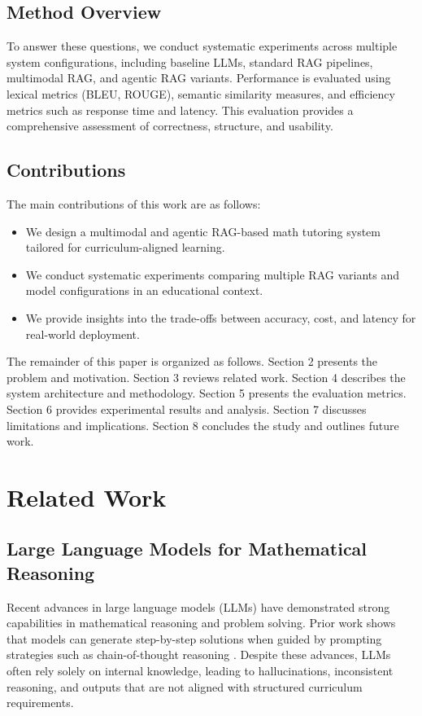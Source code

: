 \documentclass[11pt]{article}
\begin{document}
\subsection{Method Overview}

To answer these questions, we conduct systematic experiments across multiple system configurations, including baseline LLMs, standard RAG pipelines, multimodal RAG, and agentic RAG variants. Performance is evaluated using lexical metrics (BLEU, ROUGE), semantic similarity measures, and efficiency metrics such as response time and latency. This evaluation provides a comprehensive assessment of correctness, structure, and usability.

\subsection{Contributions}

The main contributions of this work are as follows:
\begin{itemize}
    \item We design a multimodal and agentic RAG-based math tutoring system tailored for curriculum-aligned learning.
    
    \item We conduct systematic experiments comparing multiple RAG variants and model configurations in an educational context.
    \item We provide insights into the trade-offs between accuracy, cost, and latency for real-world deployment.
\end{itemize}

The remainder of this paper is organized as follows. Section 2 presents the problem and motivation. Section 3 reviews related work. Section 4 describes the system architecture and methodology. Section 5 presents the evaluation metrics. Section 6 provides experimental results and analysis. Section 7 discusses limitations and implications. Section 8 concludes the study and outlines future work.

\section{Related Work}

\subsection{Large Language Models for Mathematical Reasoning}

Recent advances in large language models (LLMs) have demonstrated strong capabilities in mathematical reasoning and problem solving. Prior work shows that models can generate step-by-step solutions when guided by prompting strategies such as chain-of-thought reasoning \cite{cobbe2021training, wei2022chain}. Despite these advances, LLMs often rely solely on internal knowledge, leading to hallucinations, inconsistent reasoning, and outputs that are not aligned with structured curriculum requirements.
\end{document}
